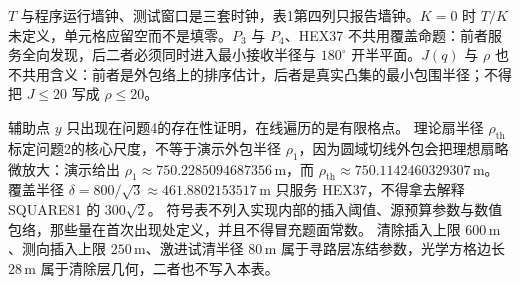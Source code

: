 $T$ 与程序运行墙钟、测试窗口是三套时钟，表1第四列只报告墙钟。$K=0$ 时 $T/K$ 未定义，单元格应留空而不是填零。$P_3$ 与 $P_4$、HEX37 不共用覆盖命题：前者服务全向发现，后二者必须同时进入最小接收半径与 $180^\circ$ 开半平面。$J(q)$ 与 $\rho$ 也不共用含义：前者是外包络上的排序估计，后者是真实凸集的最小包围半径；不得把 $J\le 20$ 写成 $\rho\le 20$。

辅助点 $y$ 只出现在问题4的存在性证明，在线遍历的是有限格点。
理论扇半径 $\rho_{\mathrm{th}}$ 标定问题2的核心尺度，不等于演示外包半径 $\rho_1$，因为圆域切线外包会把理想扇略微放大：演示给出 $\rho_1\approx 750.2285094687356\,\mathrm{m}$，而 $\rho_{\mathrm{th}}\approx 750.1142460329307\,\mathrm{m}$。
覆盖半径 $\delta=800/\sqrt{3}\approx 461.8802153517\,\mathrm{m}$ 只服务 HEX37，不得拿去解释 SQUARE81 的 $300\sqrt{2}$。
符号表不列入实现内部的插入阈值、源预算参数与数值包络，那些量在首次出现处定义，并且不得冒充题面常数。
清除插入上限 $600\,\mathrm{m}$、测向插入上限 $250\,\mathrm{m}$、激进试清半径 $80\,\mathrm{m}$ 属于寻路层冻结参数，光学方格边长 $28\,\mathrm{m}$ 属于清除层几何，二者也不写入本表。
